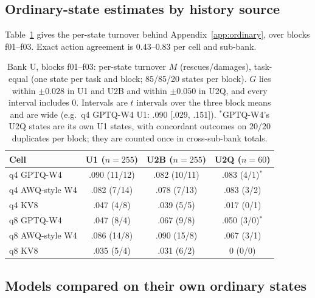 \subsection{Ordinary-state estimates by history source}
\label{app:banku}

Table~\ref{tab:banku} gives the per-state turnover behind Appendix~\ref{app:ordinary}, over blocks f01--f03. Exact action agreement is 0.43--0.83 per cell and sub-bank. %

\begin{table}[t]
\centering%
\renewcommand{\arraystretch}{1.12}\fontsize{8.5}{10}\selectfont\setlength{\tabcolsep}{4pt}
\begin{tabular}{@{}lccc@{}}
\toprule
Cell & U1 ($n{=}255$) & U2B ($n{=}255$) & U2Q ($n{=}60$) \\
\midrule
q4 GPTQ-W4 & .090 (11/12) & .082 (10/11) & .083 (4/1)$^\ast$ \\
q4 AWQ-style W4  & .082 (7/14) & .078 (7/13) & .083 (3/2) \\
q4 KV8     & .047 (4/8) & .039 (5/5) & .017 (0/1) \\
q8 GPTQ-W4 & .047 (8/4) & .067 (9/8) & .050 (3/0)$^\ast$ \\
q8 AWQ-style W4  & .086 (14/8) & .090 (15/8) & .067 (3/1) \\
q8 KV8     & .035 (5/4) & .031 (6/2) & 0 (0/0) \\
\bottomrule
\end{tabular}
\caption{Bank U, blocks f01--f03: per-state turnover $M$ (rescues/damages), task-equal (one state per task and block; 85/85/20 states per block). $G$ lies within $\pm0.028$ in U1 and U2B and within $\pm0.050$ in U2Q, and every interval includes 0. Intervals are $t$ intervals over the three block means and are wide (e.g.\ q4 GPTQ-W4 U1: .090 [.029, .151]). $^\ast$GPTQ-W4's U2Q states are its own U1 states, with concordant outcomes on 20/20 duplicates per block; they are counted once in cross-sub-bank totals.}
\label{tab:banku}
\end{table}

\subsection{Models compared on their own ordinary states}
\label{app:mistral}
